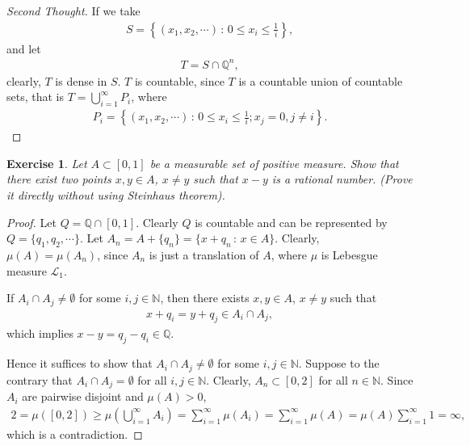 \documentclass[11pt]{book}
\newtheorem{exercise}{Exercise}[section]
\theoremstyle{definition}
\numberwithin{equation}{chapter}
\begin{document}
\medskip

\begin{proof}[Second Thought]
If we take
\begin{align*}
    S = \left\{(x_1, x_2, \cdots) \,:\, 0 \leq x_i \leq \frac{1}{i} \right\},
\end{align*}
and let
\begin{align*}
    T = S \cap \mathbb{Q}^n,
\end{align*}
clearly, $T$ is dense in $S$. $T$ is countable, since $T$ is a countable union of countable sets, that is $T = \bigcup^\infty_{i=1} P_i$, where
\begin{align*}
    P_i = \left\{(x_1, x_2, \cdots) \,:\, 0 \leq x_i \leq \frac{1}{i}; x_j = 0, j \neq i \right\}.
\end{align*}
\end{proof}

\medskip

\begin{exercise}
Let $A\subset [0,1]$ be a measurable set of positive measure. Show that there exist two points $x,y\in A$, $x\neq y$ such that $x-y$ is a rational number. (Prove it directly without using Steinhaus theorem).
\end{exercise}
\begin{proof}
Let $Q = \mathbb{Q} \cap [0,1]$. Clearly $Q$ is countable and can be represented by $Q = \{q_1, q_2, \cdots\}$. Let $A_n = A + \{q_n\} = \{x + q_n \,:\, x \in A\}$. Clearly, $\mu(A) = \mu(A_n)$, since $A_n$ is just a translation of $A$, where $\mu$ is Lebesgue measure $\mathcal{L}_1$.

If $A_i \cap A_j \neq \emptyset$ for some $i,j \in \mathbb{N}$, then there exists $x, y \in A$, $x \neq y$ such that
\begin{align*}
    x + q_i = y + q_j \in A_i \cap A_j,
\end{align*}
which implies $x - y = q_j - q_i \in \mathbb{Q}$. 

Hence it suffices to show that $A_i \cap A_j \neq \emptyset$ for some $i,j \in \mathbb{N}$. Suppose to the contrary that $A_i \cap A_j = \emptyset$ for all $i,j \in \mathbb{N}$. Clearly, $A_n \subset [0,2]$ for all $n \in \mathbb{N}$. Since $A_i$ are pairwise disjoint and $\mu(A) > 0$, 
\begin{align*}
    2 = \mu([0,2]) \geq \mu\left(\bigcup^\infty_{i=1} A_i \right) = \sum^\infty_{i=1} \mu(A_i) = \sum^\infty_{i=1} \mu(A) = \mu(A) \sum^\infty_{i=1} 1 = \infty,
\end{align*}
which is a contradiction.
\end{proof}
\end{document}
